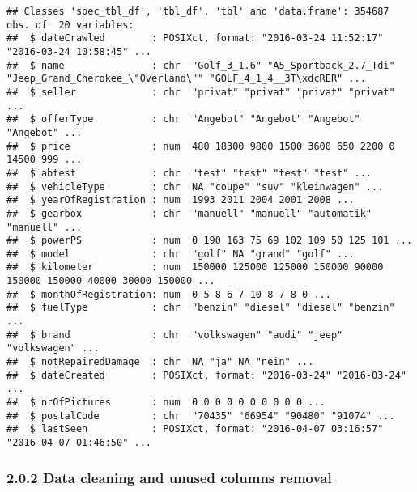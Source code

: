 \documentclass[]{article}
\begin{document}
\begin{verbatim}
## Classes 'spec_tbl_df', 'tbl_df', 'tbl' and 'data.frame': 354687 obs. of  20 variables:
##  $ dateCrawled        : POSIXct, format: "2016-03-24 11:52:17" "2016-03-24 10:58:45" ...
##  $ name               : chr  "Golf_3_1.6" "A5_Sportback_2.7_Tdi" "Jeep_Grand_Cherokee_\"Overland\"" "GOLF_4_1_4__3T\xdcRER" ...
##  $ seller             : chr  "privat" "privat" "privat" "privat" ...
##  $ offerType          : chr  "Angebot" "Angebot" "Angebot" "Angebot" ...
##  $ price              : num  480 18300 9800 1500 3600 650 2200 0 14500 999 ...
##  $ abtest             : chr  "test" "test" "test" "test" ...
##  $ vehicleType        : chr  NA "coupe" "suv" "kleinwagen" ...
##  $ yearOfRegistration : num  1993 2011 2004 2001 2008 ...
##  $ gearbox            : chr  "manuell" "manuell" "automatik" "manuell" ...
##  $ powerPS            : num  0 190 163 75 69 102 109 50 125 101 ...
##  $ model              : chr  "golf" NA "grand" "golf" ...
##  $ kilometer          : num  150000 125000 125000 150000 90000 150000 150000 40000 30000 150000 ...
##  $ monthOfRegistration: num  0 5 8 6 7 10 8 7 8 0 ...
##  $ fuelType           : chr  "benzin" "diesel" "diesel" "benzin" ...
##  $ brand              : chr  "volkswagen" "audi" "jeep" "volkswagen" ...
##  $ notRepairedDamage  : chr  NA "ja" NA "nein" ...
##  $ dateCreated        : POSIXct, format: "2016-03-24" "2016-03-24" ...
##  $ nrOfPictures       : num  0 0 0 0 0 0 0 0 0 0 ...
##  $ postalCode         : chr  "70435" "66954" "90480" "91074" ...
##  $ lastSeen           : POSIXct, format: "2016-04-07 03:16:57" "2016-04-07 01:46:50" ...
\end{verbatim}

\hypertarget{data-cleaning-and-unused-columns-removal}{%
\subsubsection{2.0.2 Data cleaning and unused columns
removal}\label{data-cleaning-and-unused-columns-removal}}
\end{document}
